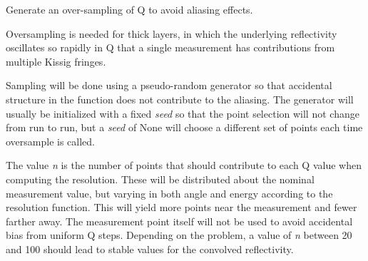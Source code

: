 \documentclass[letterpaper,10pt,english]{sphinxmanual}
\begin{document}
\begin{fulllineitems}
\begin{fulllineitems}
\label{api/probe:refl1d.probe.PolarizedNeutronProbe.mp}
\end{fulllineitems}


\begin{fulllineitems}
\label{api/probe:refl1d.probe.PolarizedNeutronProbe.name}
\end{fulllineitems}


\begin{fulllineitems}
\label{api/probe:refl1d.probe.PolarizedNeutronProbe.oversample}
Generate an over-sampling of Q to avoid aliasing effects.

Oversampling is needed for thick layers, in which the underlying
reflectivity oscillates so rapidly in Q that a single measurement
has contributions from multiple Kissig fringes.

Sampling will be done using a pseudo-random generator so that
accidental structure in the function does not contribute to the
aliasing.  The generator will usually be initialized with a fixed
\emph{seed} so that the point selection will not change from run to run,
but a \emph{seed} of None will choose a different set of points each time
oversample is called.

The value \emph{n} is the number of points that should contribute to
each Q value when computing the resolution.   These will be
distributed about the nominal measurement value, but varying in
both angle and energy according to the resolution function.  This
will yield more points near the measurement and fewer farther away.
The measurement point itself will not be used to avoid accidental
bias from uniform Q steps.  Depending on the problem, a value of
\emph{n} between 20 and 100 should lead to stable values for the convolved
reflectivity.

\end{fulllineitems}


\begin{fulllineitems}
\label{api/probe:refl1d.probe.PolarizedNeutronProbe.parameters}
\end{fulllineitems}


\end{fulllineitems}
\end{document}
